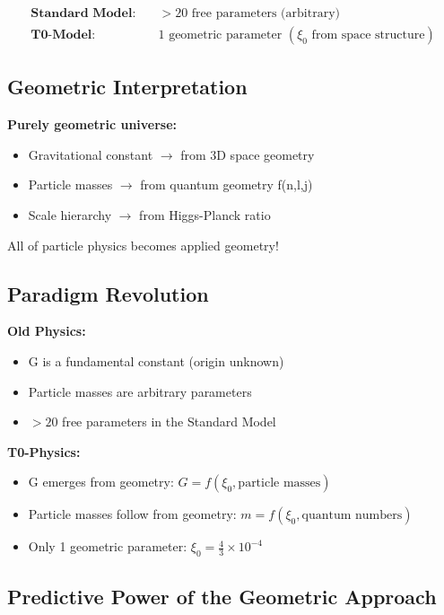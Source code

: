 \documentclass[12pt,a4paper]{article}
\newcommand{\xiconst}{\xi_0 = \frac{4}{3} \times 10^{-4}}
\theoremstyle{definition}
\begin{document}
\begin{align}
	\textbf{Standard Model:} \quad &>20 \text{ free parameters (arbitrary)}\\
	\textbf{T0-Model:} \quad &1 \text{ geometric parameter } (\xi_0 \text{ from space structure})
\end{align}

\subsection{Geometric Interpretation}

\begin{tcolorbox}[colback=orange!5!white,colframe=orange!75!black,title=Einstein's Vision Fulfilled]
	\textbf{Purely geometric universe:}
	\begin{itemize}
		\item Gravitational constant $\rightarrow$ from 3D space geometry
		\item Particle masses $\rightarrow$ from quantum geometry f(n,l,j)  
		\item Scale hierarchy $\rightarrow$ from Higgs-Planck ratio
	\end{itemize}
	
	All of particle physics becomes applied geometry!
\end{tcolorbox}

\subsection{Paradigm Revolution}

\textbf{Old Physics:} 
\begin{itemize}
	\item G is a fundamental constant (origin unknown)
	\item Particle masses are arbitrary parameters
	\item $>20$ free parameters in the Standard Model
\end{itemize}

\textbf{T0-Physics:}
\begin{itemize}
	\item G emerges from geometry: $G = f(\xi_0, \text{particle masses})$
	\item Particle masses follow from geometry: $m = f(\xi_0, \text{quantum numbers})$
	\item Only 1 geometric parameter: $\xiconst$
\end{itemize}
\subsection{Predictive Power of the Geometric Approach}
\end{document}
